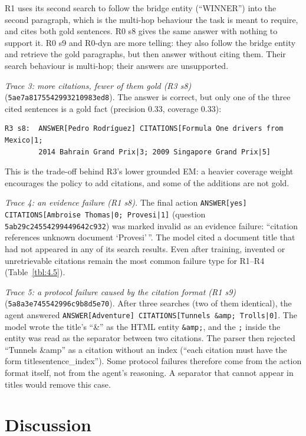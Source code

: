 R1 uses its second search to follow the bridge entity (``WINNER'') into
the second paragraph, which is the multi-hop behaviour the task is meant
to require, and cites both gold sentences. R0 s8 gives the same answer
with nothing to support it. R0 s9 and R0-dyn are more telling: they also
follow the bridge entity and retrieve the gold paragraphs, but then
answer without citing them. Their search behaviour is multi-hop; their
answers are unsupported.

\emph{Trace 3: more citations, fewer of them gold (R3 s8)}
(\texttt{5ae7a8175542993210983ed8}). The answer is correct, but only one
of the three cited sentences is a gold fact (precision 0.33, coverage
0.33):

\begin{Verbatim}
R3 s8:  ANSWER[Pedro Rodríguez] CITATIONS[Formula One drivers from Mexico|1;
        2014 Bahrain Grand Prix|3; 2009 Singapore Grand Prix|5]
\end{Verbatim}

This is the trade-off behind R3's lower grounded EM: a heavier coverage
weight encourages the policy to add citations, and some of the additions
are not gold.

\emph{Trace 4: an evidence failure (R1 s8).} The final action
\texttt{ANSWER{[}yes{]} CITATIONS{[}Ambroise Thomas|0; Provesi|1{]}}
(question \texttt{5ab29c24554299449642c932}) was marked invalid as an
evidence failure: ``citation references unknown document `Provesi'\,''.
The model cited a document title that had not appeared in any of its
search results. Even after training, invented or unretrievable citations
remain the most common failure type for R1--R4 (Table~\ref{tbl:4.5}).

\emph{Trace 5: a protocol failure caused by the citation format (R1 s9)}
(\texttt{5a8a3e745542996c9b8d5e70}). After three searches (two of them
identical), the agent answered
\texttt{ANSWER{[}Adventure{]} CITATIONS{[}Tunnels \&amp; Trolls|0{]}}.
The model wrote the title's ``\&'' as the HTML entity \texttt{\&amp;},
and the \texttt{;} inside the entity was read as the separator between
two citations. The parser then rejected ``Tunnels \&amp'' as a citation
without an index (``each citation must have the form
title\textbar sentence\_index''). Some protocol failures therefore come
from the action format itself, not from the agent's reasoning. A
separator that cannot appear in titles would remove this case.

\section{Discussion}\label{sec:4.8}

